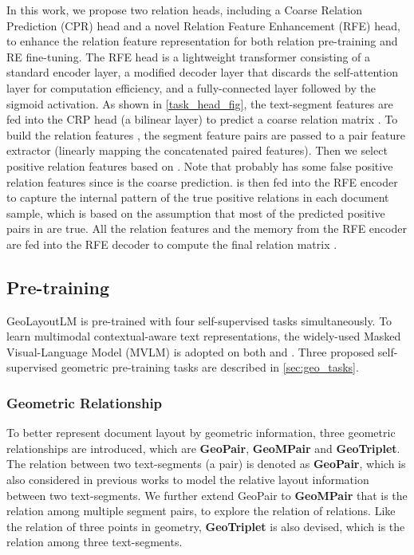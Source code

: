 \documentclass[10pt,twocolumn,letterpaper]{article}
\begin{document}
In this work, we propose two relation heads, including a Coarse Relation Prediction (CPR) head and a novel Relation Feature Enhancement (RFE) head, to enhance the relation feature representation for both relation pre-training and RE fine-tuning.
The RFE head is a lightweight transformer\cite{vaswani2017attention} consisting of a standard encoder layer, a modified decoder layer that discards the self-attention layer for computation efficiency, and a fully-connected layer followed by the sigmoid activation.
As shown in \cref{task_head_fig}, the text-segment features  are fed into the CRP head (a bilinear layer) to predict a coarse relation matrix .
To build the relation features , the segment feature pairs are passed to a pair feature extractor (linearly mapping the concatenated paired features).
Then we select positive relation features  based on .
Note that  probably has some false positive relation features since  is the coarse prediction.
 is then fed into the RFE encoder to capture the internal pattern of the true positive relations in each document sample, which is based on the assumption that most of the predicted positive pairs in  are true.
All the relation features  and the memory from the RFE encoder are fed into the RFE decoder to compute the final relation matrix .




\subsection{Pre-training}





GeoLayoutLM is pre-trained with four self-supervised tasks simultaneously.
To learn multimodal contextual-aware text representations, the widely-used Masked Visual-Language Model (MVLM)\cite{xu2020layoutlm,xu2020layoutlmv2,huang2022layoutlmv3} is adopted on both  and .
Three proposed self-supervised geometric pre-training tasks are described in \cref{sec:geo_tasks}.











\subsubsection{Geometric Relationship}
To better represent document layout by geometric information, three geometric relationships are introduced, which are \textbf{GeoPair}, \textbf{GeoMPair} and \textbf{GeoTriplet}.
The relation between two text-segments (a pair) is denoted as \textbf{GeoPair}, which is also considered in previous works\cite{liu2019graph,luo2020merge,li2021structext} to model the relative layout information between two text-segments.
We further extend GeoPair to \textbf{GeoMPair} that is the relation among multiple segment pairs, to explore the relation of relations.
Like the relation of three points in geometry, \textbf{GeoTriplet} is also devised, which is the relation among three text-segments.
\end{document}
